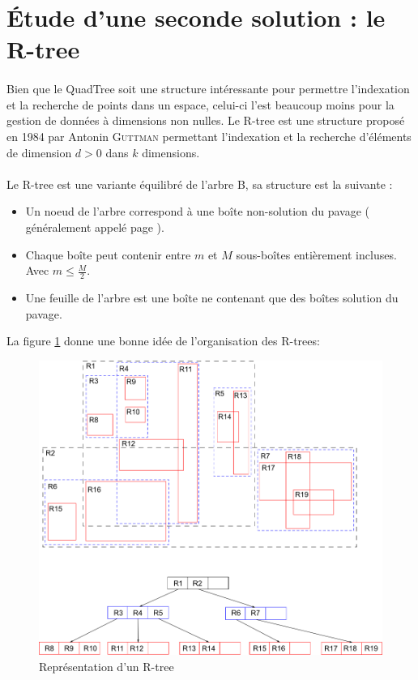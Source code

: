 \section{\'Etude d'une seconde solution : le R-tree}
\paragraph{}Bien que le QuadTree soit une structure intéressante pour permettre l'indexation et la recherche de points dans un espace, celui-ci l'est beaucoup moins pour la gestion de données à dimensions non nulles. Le R-tree est une structure proposé en 1984 par Antonin \textsc{Guttman} permettant l'indexation et la recherche d'éléments de dimension $d > 0$ dans $k$ dimensions\cite{Guttman}.

\paragraph{}Le R-tree est une variante équilibré de l'arbre B, sa structure est la suivante :
\begin{itemize}
 \item Un noeud de l'arbre correspond à une boîte non-solution du pavage ( généralement appelé \og page \fg{}).
 \item Chaque boîte peut contenir entre $m$ et $M$ sous-boîtes entièrement incluses. Avec $m\leq \frac{M}{2}$.
 \item Une feuille de l'arbre est une boîte ne contenant que des boîtes solution du pavage.
\end{itemize}

La figure \ref{fig:rtree} donne une bonne idée de l'organisation des R-trees:
\begin{figure}[htbp]
\centering
\includegraphics[scale=0.50]{img/rtree}
\caption{Représentation d'un R-tree\cite{wiki}}
\label{fig:rtree}
\end{figure}

